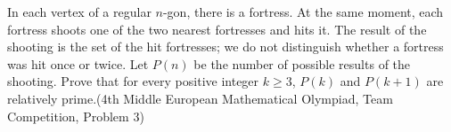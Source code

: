 In each vertex of a regular $n$-gon, there is a fortress.  At the same moment, each fortress shoots one of the two nearest fortresses and hits it. The result of the shooting is the set of the hit fortresses; we do not distinguish whether a fortress was hit once or twice. Let $P(n)$ be the number of possible results of the shooting. Prove that for every positive integer $k\geqslant 3$,  $P(k)$ and $P(k+1)$ are relatively prime.(4th Middle European Mathematical Olympiad, Team Competition, Problem 3)